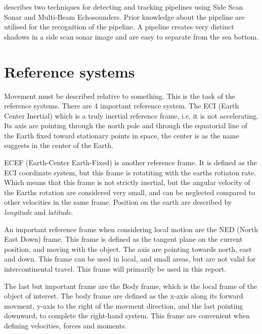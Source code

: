 	\cite{side_scan_sonar} describes two techniques for detecting and tracking pipelines using Side Scan
	Sonar and Multi-Beam Echosounders. Prior knowledge about the pipeline are utilised for the recognition
	of the pipeline. A pipeline creates very distinct shadows in a side scan sonar image and are easy to
	separate from the sea bottom.



\section{Reference systems}
	Movement must be described relative to something. This is the task of the reference systems. There are
	4 important reference system. The ECI (Earth Center Inertial) which is a truly inertial reference
	frame, i.e. it is not accelerating. Its axis are pointing through the north pole and through the
	equatorial line of the Earth fixed toward stationary points in space, the center is as the name
	suggests in the center of the Earth. 
	
	ECEF (Earth-Center Earth-Fixed) is another reference frame. It is defined as the ECI coordinate
	system, but this frame is rotatiting with the earths rotiaton rate. Which means that this frame is not
	strictly inertial, but the angular velocity of the Earths rotation are considered very small, and can
	be neglected compared to other velocities in the same frame. Position on the earth are described by
	\textit{longitude} and \textit{latitude}.

	An important reference frame when considering local motion are the NED (North East Down) frame. This
	frame is defined as the tangent plane on the current position, and moving with the object. The axis
	are pointing towards north, east and down. This frame can be used in local, and small areas, but are
	not valid for intercontinental travel. This frame will primarily be used in this report. 

	The last but important frame are the Body frame, which is the local frame of the object of interest.
	The body frame are defined as the x-axis along its forward movment, y-axis to the right of the movment
	direction, and the last pointing downward, to complete the right-hand system. This frame are
	convenient when defining velocities, forces and moments.
	

